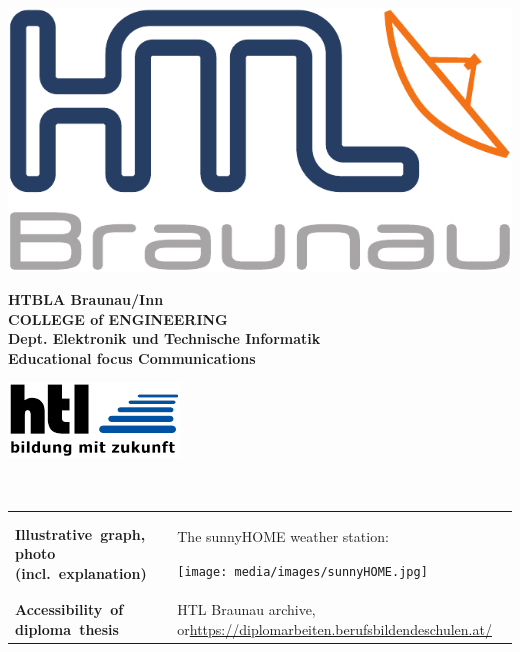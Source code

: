 \begin{minipage}[c]{0.20\linewidth}
\includegraphics[width=0.8\linewidth]{media/images/htl_c_cmyk_rein}
\end{minipage}
\begin{minipage}[c]{0.6\linewidth}
\begin{center}
{\bfseries\sffamily\large HTBLA Braunau/Inn\\
COLLEGE of ENGINEERING\\
Dept. Elektronik und Technische Informatik\\
{\normalsize Educational focus Communications} }
\end{center}
\end{minipage}
\begin{minipage}[c]{0.2\linewidth}
\hfill \includegraphics[width=0.8\linewidth]{media/images/htl-bildung-mit-zukunft}
\end{minipage}\\

\vspace{1em}

\renewcommand{\arraystretch}{2}
\begin{tabularx}{1\textwidth}{ p{3.5cm} X }

\textbf{\mbox{Illustrative graph,} \mbox{photo} \mbox{(incl. explanation)}} & 
{
The sunnyHOME weather station:
\begin{center}
	\texttt{[image: media/images/sunnyHOME.jpg]}
\end{center}
} \\

\textbf{\mbox{Accessibility of} \mbox{diploma thesis}} & 
{HTL Braunau archive, or\newline \url{https://diplomarbeiten.berufsbildendeschulen.at/}} \\



\end{tabularx}




